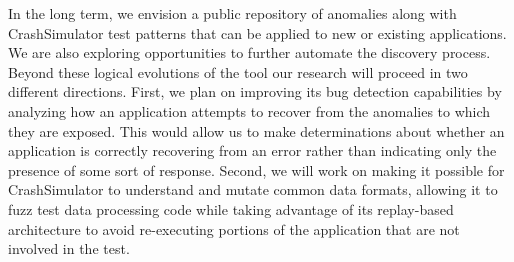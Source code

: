 In the long term, we
envision a public repository of anomalies along with CrashSimulator test
patterns that can be applied to new or existing applications.
We are also exploring
opportunities to further automate the discovery process.  Beyond these logical
evolutions of the tool our research will proceed in
two different directions.  First, we plan on improving
its bug detection capabilities by analyzing how an
application attempts
to recover from the anomalies to which they are exposed.  This would allow
us to make determinations about whether an application is correctly recovering
from an error rather than indicating only the presence of some sort of response.
Second, we will work on making it possible for CrashSimulator to
understand and mutate common data formats, allowing it
to fuzz test data processing code while taking advantage of its
replay-based architecture to avoid re-executing portions of the application
that are not involved in the test.
